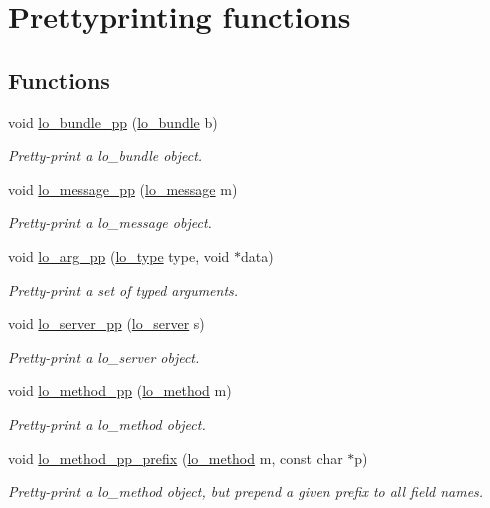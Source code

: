 \hypertarget{group__pp}{\section{Prettyprinting functions}
\label{group__pp}
}
\subsection*{Functions}
\begin{DoxyCompactItemize}
\item 
void \hyperlink{group__pp_ga97e508300ee8b57d4ba1f20a1c4d0235}{lo\+\_\+bundle\+\_\+pp} (\hyperlink{lo__types_8h_a96254950ad34e9cfbf8a6613fc74025b}{lo\+\_\+bundle} b)
\begin{DoxyCompactList}\small\item\em Pretty-\/print a lo\+\_\+bundle object. \end{DoxyCompactList}\item 
void \hyperlink{group__pp_ga5fa7f79f6f490d9a462d6cd894df3b76}{lo\+\_\+message\+\_\+pp} (\hyperlink{lo__types_8h_ad126083c98d941f00eb72d1690b38d63}{lo\+\_\+message} m)
\begin{DoxyCompactList}\small\item\em Pretty-\/print a lo\+\_\+message object. \end{DoxyCompactList}\item 
void \hyperlink{group__pp_ga1699678a3a2d4221bb55fa2e05326ef0}{lo\+\_\+arg\+\_\+pp} (\hyperlink{group__liblo_ga11838c576b0197c255ce805fd7434736}{lo\+\_\+type} type, void $\ast$data)
\begin{DoxyCompactList}\small\item\em Pretty-\/print a set of typed arguments. \end{DoxyCompactList}\item 
void \hyperlink{group__pp_ga31b1944c9f06645d87bdffbf769a1945}{lo\+\_\+server\+\_\+pp} (\hyperlink{lo__types_8h_a59067bf50cf8abb4371da6f03c9036c9}{lo\+\_\+server} s)
\begin{DoxyCompactList}\small\item\em Pretty-\/print a lo\+\_\+server object. \end{DoxyCompactList}\item 
void \hyperlink{group__pp_ga220be2c9f4cfe4516ebcb5c4687a2b9f}{lo\+\_\+method\+\_\+pp} (\hyperlink{lo__types_8h_a66faedf5da13231d8c0166870477dce5}{lo\+\_\+method} m)
\begin{DoxyCompactList}\small\item\em Pretty-\/print a lo\+\_\+method object. \end{DoxyCompactList}\item 
void \hyperlink{group__pp_ga1ea3369b4cf60368cba3336682afcaad}{lo\+\_\+method\+\_\+pp\+\_\+prefix} (\hyperlink{lo__types_8h_a66faedf5da13231d8c0166870477dce5}{lo\+\_\+method} m, const char $\ast$p)
\begin{DoxyCompactList}\small\item\em Pretty-\/print a lo\+\_\+method object, but prepend a given prefix to all field names. \end{DoxyCompactList}\end{DoxyCompactItemize}


